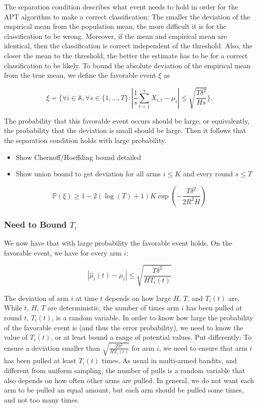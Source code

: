 \documentclass[12pt,]{article}
\providecommand{\tightlist}{%
  \setlength{\itemsep}{0pt}\setlength{\parskip}{0pt}}
\begin{document}
The separation condition describes what event needs to hold in order for
the APT algorithm to make a correct classification: The smaller the
deviation of the empirical mean from the population mean, the more
difficult it is for the classification to be wrong. Moreover, if the
mean and empirical mean are identical, then the classification is
correct independent of the threshold. Also, the closer the mean to the
threshold, the better the estimate has to be for a correct
classification to be likely. To bound the absolute deviation of the
empirical mean from the true mean, we define the favorable event \(\xi\)
as

\[
\xi = \Big\{\forall i \in \mathbb{A}, \forall s \in \{1,...,T\} : |\frac{1}{s} \sum_{t=1}^{s}X_{i,t} - \mu_i| \leq \sqrt{\frac{T \delta^2}{H s}} \Big\}.
\]

The probability that this favorable event occurs should be large, or
equivalently, the probability that the deviation is small should be
large. Then it follows that the separation condition holds with large
probability.

\begin{itemize}
\tightlist
\item
  Show Chernoff/Hoeffding bound detailed
\item
  Show union bound to get deviation for all arms \(i \leq K\) and every
  round \(s \leq T\)
\end{itemize}

\[
\mathbb{P}(\xi) \geq 1 - 2(\log(T) +1)K \exp(-\frac{T\delta^2}{2R^2H})
\]

\subsubsection{\texorpdfstring{Need to Bound
\(T_i\)}{Need to Bound T\_i}}\label{need-to-bound-t_i}

We now have that with large probability the favorable event holds. On
the favorable event, we have for every arm \(i\):

\[
| \hat{\mu}_i(t) - \mu_i| \leq \sqrt{\frac{T\delta^2}{HT_i(t)}}
\]

The deviation of arm \(i\) at time \(t\) depends on how large \(H\),
\(T\), and \(T_i(t)\) are. While \(t\), \(H\), \(T\) are deterministic,
the number of times arm \(i\) has been pulled at round \(t\),
\(T_i(t)\), is a random variable. In order to know how large the
probability of the favorable event is (and thus the error probability),
we need to know the value of \(T_i(t)\), or at least bound a range of
potential values. Put differently: To ensure a deviation smaller than
\(\sqrt{\frac{T\delta^2}{HT_i(t)}}\) for arm \(i\), we need to ensure
that arm \(i\) has been pulled at least \(T_i(t)\) times. As usual in
multi-armed bandits, and different from uniform sampling, the number of
pulls is a random variable that also depends on how often other arms are
pulled. In general, we do not want each arm to be pulled an equal
amount, but each arm should be pulled some times, and not too many
times.
\end{document}
